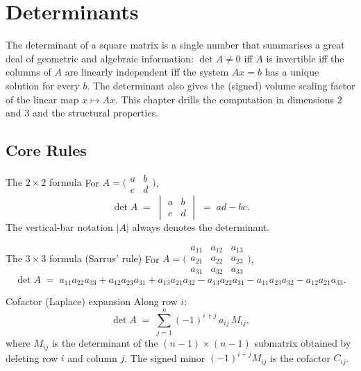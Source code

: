 \chapter{Determinants}

The determinant of a square matrix is a single number
that summarises a great deal of geometric and algebraic information:
$\det A \neq 0$ iff $A$ is invertible iff the columns of $A$ are linearly
independent iff the system $A x = b$ has a unique solution for every $b$.
The determinant also gives the (signed) volume scaling factor of the linear
map $x \mapsto A x$. This chapter drills the computation in dimensions $2$
and $3$ and the structural properties.

\section{Core Rules}

\begin{rulebox}{The $2 \times 2$ formula}
For $A = \bigl(\begin{smallmatrix} a & b \\ c & d \end{smallmatrix}\bigr)$,
\[
  \det A \;=\; \begin{vmatrix} a & b \\ c & d \end{vmatrix} \;=\; a d - b c.
\]
The vertical-bar notation $\lvert A \rvert$ always denotes the determinant.
\end{rulebox}

\begin{rulebox}{The $3 \times 3$ formula (Sarrus' rule)}
For $A = \bigl(\begin{smallmatrix} a_{11} & a_{12} & a_{13} \\ a_{21} & a_{22} & a_{23} \\ a_{31} & a_{32} & a_{33} \end{smallmatrix}\bigr)$,
\[
  \det A \;=\; a_{11} a_{22} a_{33} + a_{12} a_{23} a_{31} + a_{13} a_{21} a_{32}
  - a_{13} a_{22} a_{31} - a_{11} a_{23} a_{32} - a_{12} a_{21} a_{33}.
\]
\end{rulebox}

\begin{rulebox}{Cofactor (Laplace) expansion}
Along row $i$:
\[
  \det A \;=\; \sum_{j = 1}^{n} (-1)^{i + j} \, a_{ij} \, M_{ij},
\]
where $M_{ij}$ is the determinant of the $(n - 1) \times (n - 1)$ submatrix
obtained by deleting row $i$ and column $j$. The signed minor
$(-1)^{i + j} M_{ij}$ is the cofactor $C_{ij}$.
\end{rulebox}

